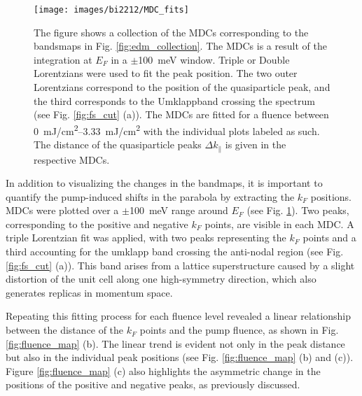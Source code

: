 \begin{figure}[t]
	\centering
	\texttt{[image: images/bi2212/MDC\_fits]}
	\caption{The figure shows a collection of the MDCs corresponding to the bandsmaps in Fig. \ref{fig:edm_collection}. The MDCs is a result of the integration at $E_F$ in a $\pm$\qty{100}{\milli\electronvolt} window. Triple or Double Lorentzians were used to fit the peak position. The two outer Lorentzians correspond to the position of the quasiparticle peak, and the third corresponds to the Umklappband crossing the spectrum (see Fig. \ref{fig:fs_cut} (a)). The MDCs are fitted for a fluence between \qtyrange{0}{3.33}{\milli\joule/\centi\meter\squared} with the individual plots labeled as such. The distance of the quasiparticle peaks $\Delta k_\parallel$ is given in the respective MDCs.}
	\label{fig:mdc_fits}
\end{figure}

In addition to visualizing the changes in the bandmaps, it is important to quantify the pump-induced shifts in the parabola by extracting the $k_F$ positions.
MDCs were plotted over a $\pm$\qty{100}{\milli\electronvolt} range around $E_F$ (see Fig. \ref{fig:mdc_fits}).
Two peaks, corresponding to the positive and negative $k_F$ points, are visible in each MDC.
A triple Lorentzian fit was applied, with two peaks representing the $k_F$ points and a third accounting for the umklapp band crossing the anti-nodal region (see Fig. \ref{fig:fs_cut} (a)).
This band arises from a lattice superstructure caused by a slight distortion of the unit cell along one high-symmetry direction, which also generates replicas in momentum space.

Repeating this fitting process for each fluence level revealed a linear relationship between the distance of the $k_F$ points and the pump fluence, as shown in Fig. \ref{fig:fluence_map} (b).
The linear trend is evident not only in the peak distance but also in the individual peak positions (see Fig. \ref{fig:fluence_map} (b) and (c)). Figure \ref{fig:fluence_map} (c) also highlights the asymmetric change in the positions of the positive and negative peaks, as previously discussed.

